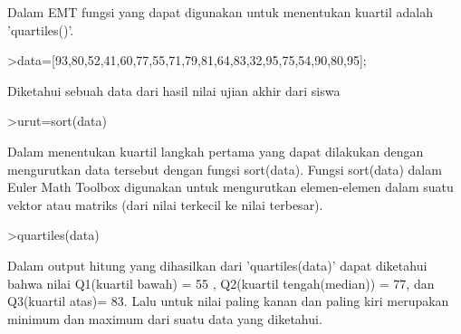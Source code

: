 \documentclass[a4paper,10pt]{article}
\begin{document}
\begin{eulernotebook}
\begin{eulercomment}
\begin{eulercomment}
\begin{eulercomment}
Dalam EMT fungsi yang dapat digunakan untuk menentukan kuartil adalah
'quartiles()'.
\end{eulercomment}
\begin{eulerprompt}
>data=[93,80,52,41,60,77,55,71,79,81,64,83,32,95,75,54,90,80,95];
\end{eulerprompt}
\begin{eulercomment}
Diketahui sebuah data dari hasil nilai ujian akhir dari siswa
\end{eulercomment}
\begin{eulerprompt}
>urut=sort(data)
\end{eulerprompt}
\begin{euleroutput}
  [32,  41,  52,  54,  55,  60,  64,  71,  75,  77,  79,  80,  80,  81,
  83,  90,  93,  95,  95]
\end{euleroutput}
\begin{eulercomment}
Dalam menentukan kuartil langkah pertama yang dapat dilakukan dengan
mengurutkan data tersebut dengan fungsi sort(data). Fungsi sort(data)
dalam Euler Math Toolbox digunakan untuk mengurutkan elemen-elemen
dalam suatu vektor atau matriks (dari nilai terkecil ke nilai
terbesar).
\end{eulercomment}
\begin{eulerprompt}
>quartiles(data)
\end{eulerprompt}
\begin{euleroutput}
  [32,  55,  77,  83,  95]
\end{euleroutput}
\begin{eulercomment}
Dalam output hitung yang dihasilkan dari 'quartiles(data)' dapat
diketahui bahwa nilai Q1(kuartil bawah) = 55 , Q2(kuartil
tengah(median)) = 77, dan Q3(kuartil atas)= 83. Lalu untuk nilai
paling kanan dan paling kiri merupakan minimum dan maximum dari suatu
data yang diketahui.


\end{eulercomment}
\end{eulercomment}
\end{eulercomment}
\end{eulernotebook}
\end{document}
